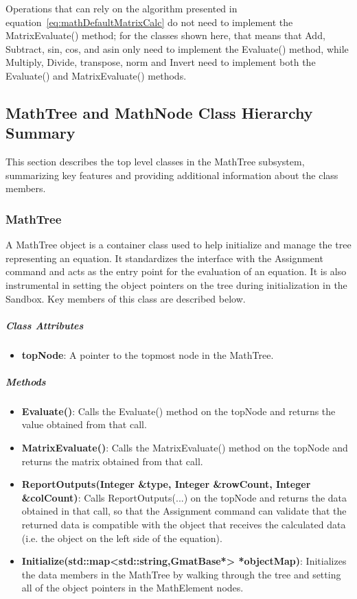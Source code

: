 Operations that can rely on the algorithm presented in equation~\ref{eq:mathDefaultMatrixCalc} do
not need to implement the MatrixEvaluate() method; for the classes shown here, that means that Add,
Subtract, sin, cos, and asin only need to implement the Evaluate() method, while Multiply, Divide,
transpose, norm and Invert need to implement both the Evaluate() and MatrixEvaluate() methods.

\subsection{MathTree and MathNode Class Hierarchy Summary}

This section describes the top level classes in the MathTree subsystem, summarizing key features and
providing additional information about the class members.

\subsubsection{MathTree}

A MathTree object is a container class used to help initialize and manage the tree representing an
equation.  It standardizes the interface with the Assignment command and acts as the entry point for
the evaluation of an equation.  It is also instrumental in setting the object pointers on the tree
during initialization in the Sandbox.  Key members of this class are described below.

\subparagraph{\textit{Class Attributes}}
\begin{itemize}
\item \textbf{topNode}: A pointer to the topmost node in the MathTree.
\end{itemize}

\subparagraph{\textit{Methods}}
\begin{itemize}
\item \textbf{Evaluate()}: Calls the Evaluate() method on the topNode and returns the value obtained
from that call.
\item \textbf{MatrixEvaluate()}: Calls the MatrixEvaluate() method on the topNode and returns the
matrix obtained from that call.
\item \textbf{ReportOutputs(Integer \&type, Integer \&rowCount, Integer \&colCount)}:  Calls
ReportOutputs(...) on the topNode and returns the data obtained in that call, so that the Assignment
command can validate that the returned data is compatible with the object that receives the
calculated data (i.e. the object on the left side of the equation).
\item \textbf{Initialize(std::map<std::string,GmatBase*> *objectMap)}: Initializes the data members
in the MathTree by walking through the tree and setting all of the object pointers in the
MathElement nodes.
\end{itemize}

